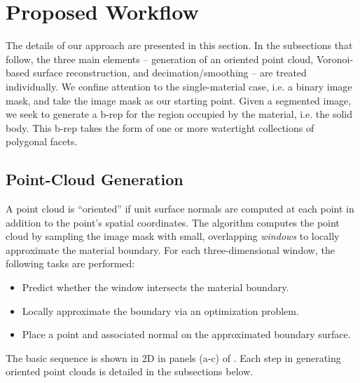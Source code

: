 \section{{Proposed Workflow}}

The details of our approach are presented in this section.  In the subsections that follow, the three main elements -- generation of an oriented point cloud, Voronoi-based surface reconstruction, and decimation/smoothing -- are treated individually.  We confine attention to the single-material case, i.e. a binary image mask, and take the image mask as our starting point.  Given a segmented image, we seek to generate a b-rep for the region occupied by the material, i.e. the solid body.  This b-rep takes the form of one or more watertight collections of polygonal facets.

\subsection{Point-Cloud Generation}
\label{Point Cloud Generation}

A point cloud is ``oriented'' if unit surface normals are computed at each point in addition to the point's spatial coordinates. The algorithm computes the point cloud by sampling the image mask with small, overlapping \textit{windows} to locally approximate the material boundary. For each three-dimensional window, the following tasks are performed:
\vspace{3mm}
\begin{itemize}[noitemsep]
  \item Predict whether the window intersects the material boundary.
  \item Locally approximate the boundary via an optimization problem. 
  \item Place a point and associated normal on the approximated boundary surface.
\end{itemize}
\vspace{3mm}
The basic sequence is shown in 2D in panels (a-c) of . Each step in generating oriented point clouds is detailed in the subsections below.

